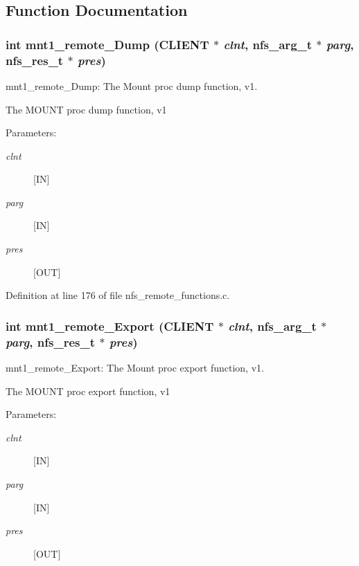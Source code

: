 \subsection{Function Documentation}
\subsubsection{\setlength{\rightskip}{0pt plus 5cm}int mnt1\_\-remote\_\-Dump (CLIENT $\ast$ {\em clnt}, nfs\_\-arg\_\-t $\ast$ {\em parg}, nfs\_\-res\_\-t $\ast$ {\em pres})}\label{group__MNTprocs_ga2}


mnt1\_\-remote\_\-Dump: The Mount proc dump function, v1.

The MOUNT proc dump function, v1

\begin{Desc}
\item[Parameters:]
\begin{description}
\item[{\em clnt}][IN] \item[{\em parg}][IN] \item[{\em pres}][OUT] \end{description}
\end{Desc}


Definition at line 176 of file nfs\_\-remote\_\-functions.c.
\subsubsection{\setlength{\rightskip}{0pt plus 5cm}int mnt1\_\-remote\_\-Export (CLIENT $\ast$ {\em clnt}, nfs\_\-arg\_\-t $\ast$ {\em parg}, nfs\_\-res\_\-t $\ast$ {\em pres})}\label{group__MNTprocs_ga5}


mnt1\_\-remote\_\-Export: The Mount proc export function, v1.

The MOUNT proc export function, v1

\begin{Desc}
\item[Parameters:]
\begin{description}
\item[{\em clnt}][IN] \item[{\em parg}][IN] \item[{\em pres}][OUT] \end{description}
\end{Desc}


